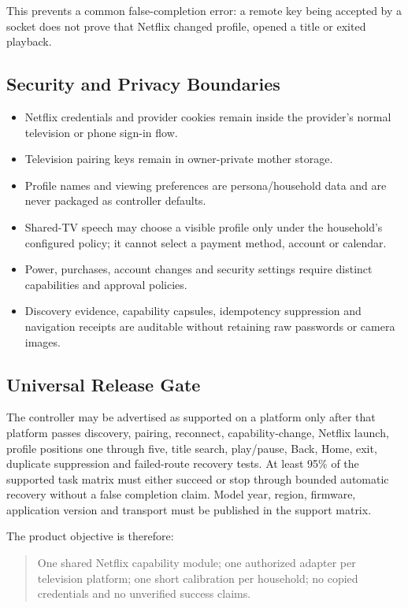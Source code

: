 This prevents a common false-completion error: a remote key being accepted by a
socket does not prove that Netflix changed profile, opened a title or exited
playback.

\subsection{Security and Privacy Boundaries}

\begin{itemize}
  \item Netflix credentials and provider cookies remain inside the provider's
        normal television or phone sign-in flow.
  \item Television pairing keys remain in owner-private mother storage.
  \item Profile names and viewing preferences are persona/household data and are
        never packaged as controller defaults.
  \item Shared-TV speech may choose a visible profile only under the household's
        configured policy; it cannot select a payment method, account or calendar.
  \item Power, purchases, account changes and security settings require distinct
        capabilities and approval policies.
  \item Discovery evidence, capability capsules, idempotency suppression and
        navigation receipts are auditable without retaining raw passwords or
        camera images.
\end{itemize}

\subsection{Universal Release Gate}

The controller may be advertised as supported on a platform only after that
platform passes discovery, pairing, reconnect, capability-change, Netflix launch,
profile positions one through five, title search, play/pause, Back, Home, exit,
duplicate suppression and failed-route recovery tests. At least 95\% of the
supported task matrix must either succeed or stop through bounded automatic
recovery without a false completion claim. Model year, region, firmware,
application version and transport must be published in the support matrix.

The product objective is therefore:

\begin{quote}
One shared Netflix capability module; one authorized adapter per television
platform; one short calibration per household; no copied credentials and no
unverified success claims.
\end{quote}

